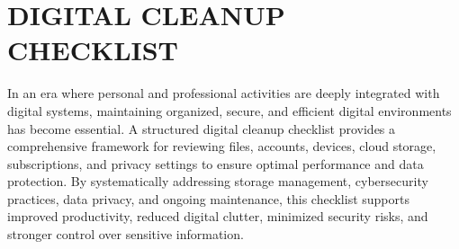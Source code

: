 
\section*{\centering DIGITAL CLEANUP CHECKLIST}
\vspace*{0.5cm}

In an era where personal and professional activities are deeply integrated with digital systems, maintaining organized, secure, and efficient digital environments has become essential. A structured digital cleanup checklist provides a comprehensive framework for reviewing files, accounts, devices, cloud storage, subscriptions, and privacy settings to ensure optimal performance and data protection. By systematically addressing storage management, cybersecurity practices, data privacy, and ongoing maintenance, this checklist supports improved productivity, reduced digital clutter, minimized security risks, and stronger control over sensitive information.

